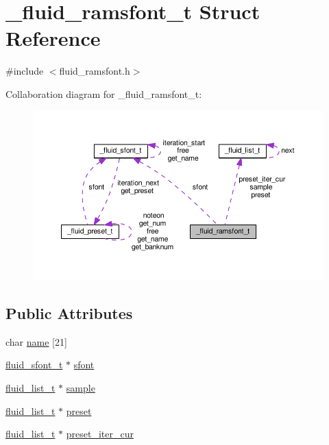 \hypertarget{struct__fluid__ramsfont__t}{}\section{\+\_\+fluid\+\_\+ramsfont\+\_\+t Struct Reference}
\label{struct__fluid__ramsfont__t}


{\ttfamily \#include $<$fluid\+\_\+ramsfont.\+h$>$}



Collaboration diagram for \+\_\+fluid\+\_\+ramsfont\+\_\+t\+:
\nopagebreak
\begin{figure}[H]
\begin{center}
\leavevmode
\includegraphics[width=350pt]{struct__fluid__ramsfont__t__coll__graph}
\end{center}
\end{figure}
\subsection*{Public Attributes}
\begin{DoxyCompactItemize}
\item 
char \hyperlink{struct__fluid__ramsfont__t_aef9999710d76db25ff24c907ca350cd1}{name} \mbox{[}21\mbox{]}
\item 
\hyperlink{types_8h_aa6c18288f76608acbb10b80a153f4ab8}{fluid\+\_\+sfont\+\_\+t} $\ast$ \hyperlink{struct__fluid__ramsfont__t_acabf1ff179d18e270e5f47087c1b14ae}{sfont}
\item 
\hyperlink{fluid__list_8h_a3ef7535d4290862c0af118569223bd89}{fluid\+\_\+list\+\_\+t} $\ast$ \hyperlink{struct__fluid__ramsfont__t_a0f1b7c5100ed0d47faaf453372a982ba}{sample}
\item 
\hyperlink{fluid__list_8h_a3ef7535d4290862c0af118569223bd89}{fluid\+\_\+list\+\_\+t} $\ast$ \hyperlink{struct__fluid__ramsfont__t_a84dfc5ed295e97334a0cae344fe953c1}{preset}
\item 
\hyperlink{fluid__list_8h_a3ef7535d4290862c0af118569223bd89}{fluid\+\_\+list\+\_\+t} $\ast$ \hyperlink{struct__fluid__ramsfont__t_a659f4f41fdd180cd5019085e7aa155db}{preset\+\_\+iter\+\_\+cur}
\end{DoxyCompactItemize}


